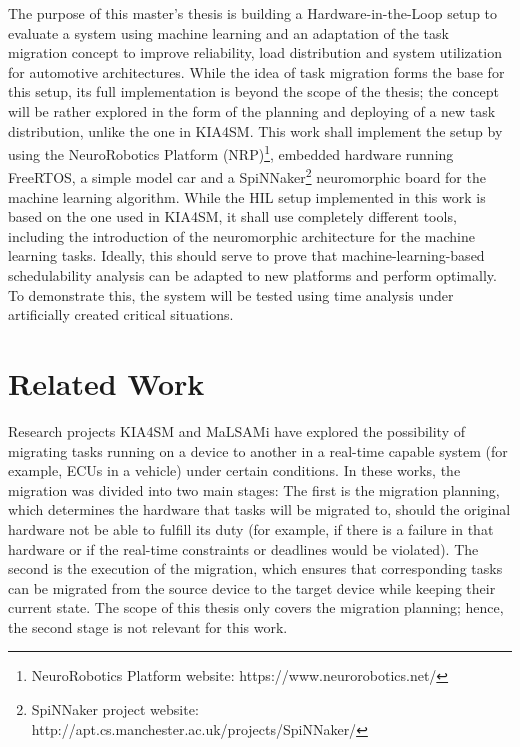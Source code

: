 The purpose of this master’s thesis is building a Hardware-in-the-Loop setup to evaluate a system using machine learning and an adaptation of the task migration concept to improve reliability, load distribution and system utilization for automotive architectures. While the idea of task migration forms the base for this setup, its full implementation is beyond the scope of the thesis; the concept will be rather explored in the form of the planning and deploying of a new task distribution, unlike the one in KIA4SM. This work shall implement the setup by using the NeuroRobotics Platform (NRP)\footnote{NeuroRobotics Platform website: https://www.neurorobotics.net/}, embedded hardware running FreeRTOS, a simple model car and a SpiNNaker\footnote{SpiNNaker project website: http://apt.cs.manchester.ac.uk/projects/SpiNNaker/} neuromorphic board for the machine learning algorithm. While the HIL setup implemented in this work is based on the one used in KIA4SM, it shall use completely different tools, including the introduction of the neuromorphic architecture for the machine learning tasks. Ideally, this should serve to prove that machine-learning-based schedulability analysis can be adapted to new platforms and perform optimally. To demonstrate this, the system will be tested using time analysis under artificially created critical situations.

\section*{Related Work}\label{section:relatedwork}
Research projects KIA4SM and MaLSAMi have explored the possibility of migrating tasks running on a device to another in a real-time capable system (for example, ECUs in a vehicle) under certain conditions. In these works, the migration was divided into two main stages: The first is the migration planning, which determines the hardware that tasks will be migrated to, should the original hardware not be able to fulfill its duty (for example, if there is a failure in that hardware or if the real-time constraints or deadlines would be violated). The second is the execution of the migration, which ensures that corresponding tasks can be migrated from the source device to the target device while keeping their current state. The scope of this thesis only covers the migration planning; hence, the second stage is not relevant for this work.

